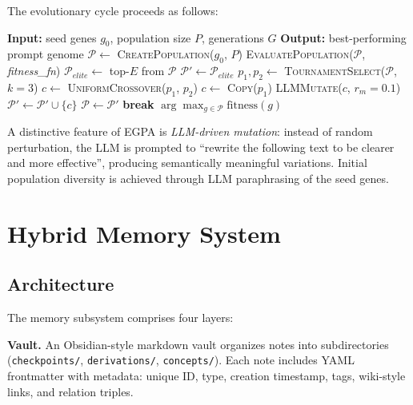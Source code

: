 \documentclass[conference]{IEEEtran}
\begin{document}
The evolutionary cycle proceeds as follows:

\begin{algorithm}[htbp]
\caption{EGPA: Evolutionary Genetic Prompt Algorithm}
\label{alg:egpa}
\begin{algorithmic}[1]
\STATE \textbf{Input:} seed genes $g_0$, population size $P$, generations $G$
\STATE \textbf{Output:} best-performing prompt genome
\STATE $\mathcal{P} \leftarrow$ \textsc{CreatePopulation}($g_0$, $P$) 
    \STATE \textsc{EvaluatePopulation}($\mathcal{P}$, \textit{fitness\_fn})
    \STATE $\mathcal{P}_{elite} \leftarrow$ top-$E$ from $\mathcal{P}$  
    \STATE $\mathcal{P}' \leftarrow \mathcal{P}_{elite}$
        \STATE $p_1, p_2 \leftarrow$ \textsc{TournamentSelect}($\mathcal{P}$, $k{=}3$)
          
            \STATE $c \leftarrow$ \textsc{UniformCrossover}($p_1$, $p_2$)
        \ELSE
            \STATE $c \leftarrow$ \textsc{Copy}($p_1$)
        \ENDIF
        \STATE \textsc{LLMMutate}($c$, $r_m{=}0.1$)  
        \STATE $\mathcal{P}' \leftarrow \mathcal{P}' \cup \{c\}$
    \ENDWHILE
    \STATE $\mathcal{P} \leftarrow \mathcal{P}'$
        \STATE \textbf{break}
    \ENDIF
\ENDFOR
\RETURN $\arg\max_{g \in \mathcal{P}} \text{fitness}(g)$
\end{algorithmic}
\end{algorithm}

A distinctive feature of EGPA is \emph{LLM-driven mutation}: instead of random perturbation, the LLM is prompted to ``rewrite the following text to be clearer and more effective'', producing semantically meaningful variations. Initial population diversity is achieved through LLM paraphrasing of the seed genes.

\section{Hybrid Memory System}
\label{sec:memory}

\subsection{Architecture}

The memory subsystem comprises four layers:

\textbf{Vault.} An Obsidian-style markdown vault organizes notes into subdirectories (\texttt{checkpoints/}, \texttt{derivations/}, \texttt{concepts/}). Each note includes YAML frontmatter with metadata: unique ID, type, creation timestamp, tags, wiki-style links, and relation triples.
\end{document}
